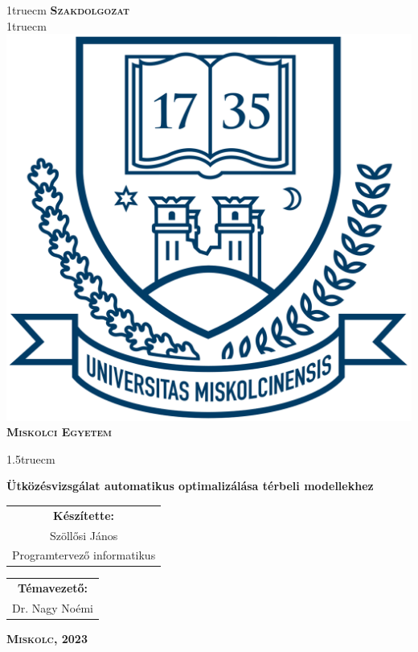 \pagestyle{empty}

{\large
\begin{center}
\vglue 1truecm
\textbf{\huge\textsc{Szakdolgozat}}\\
\vglue 1truecm
\includegraphics[width=4.8truecm, height=4truecm]{images/me_logo.png}\\
\textbf{\textsc{Miskolci Egyetem}}
\end{center}}

\vglue 1.5truecm


{\LARGE
\begin{center}
\textbf{Ütközésvizsgálat automatikus optimalizálása térbeli modellekhez}
\end{center}}

\vspace*{2.5truecm}
{\large
\begin{center}
\begin{tabular}{c}
\textbf{Készítette:}\\
Szöllősi János\\
Programtervező informatikus
\end{tabular}
\end{center}
\begin{center}
\begin{tabular}{c}
\textbf{Témavezető:}\\
Dr. Nagy Noémi
\end{tabular}
\end{center}}
\vfill
{\large
\begin{center}
\textbf{\textsc{Miskolc, 2023}}
\end{center}}

\newpage

